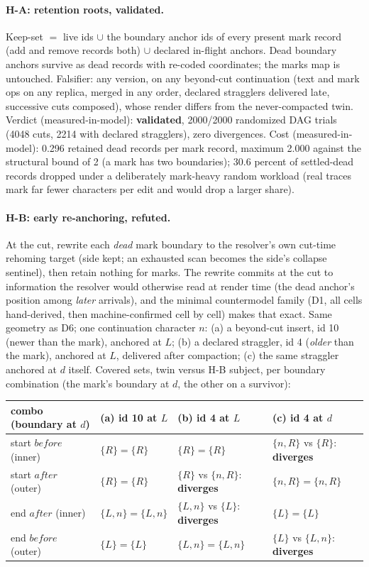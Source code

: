 \documentclass[11pt]{article}
\begin{document}
\paragraph{H-A: retention roots, validated.} Keep-set $=$ live ids
$\cup$ the boundary anchor ids of every present mark record (add and
remove records both) $\cup$ declared in-flight anchors. Dead boundary
anchors survive as dead records with re-coded coordinates; the marks
map is untouched. Falsifier: any version, on any beyond-cut
continuation (text and mark ops on any replica, merged in any order,
declared stragglers delivered late, successive cuts composed), whose
render differs from the never-compacted twin. Verdict
(measured-in-model): \textbf{validated}, 2000/2000 randomized DAG
trials (4048 cuts, 2214 with declared stragglers), zero divergences.
Cost (measured-in-model): 0.296 retained dead records per mark record,
maximum 2.000 against the structural bound of 2 (a mark has two
boundaries); 30.6 percent of settled-dead records dropped under a
deliberately mark-heavy random workload (real traces mark far fewer
characters per edit and would drop a larger share).

\paragraph{H-B: early re-anchoring, refuted.} At the cut, rewrite each
\emph{dead} mark boundary to the resolver's own cut-time rehoming
target (side kept; an exhausted scan becomes the side's collapse
sentinel), then retain nothing for marks. The rewrite commits at the
cut to information the resolver would otherwise read at render time
(the dead anchor's position among \emph{later} arrivals), and the
minimal countermodel family (D1, all cells hand-derived, then
machine-confirmed cell by cell) makes that exact. Same geometry as D6;
one continuation character $n$: (a) a beyond-cut insert, id 10 (newer
than the mark), anchored at $L$; (b) a declared straggler, id 4
(\emph{older} than the mark), anchored at $L$, delivered after
compaction; (c) the same straggler anchored at $d$ itself. Covered
sets, twin versus H-B subject, per boundary combination (the mark's
boundary at $d$, the other on a survivor):

\begin{center}\small
\begin{tabular}{@{}llll@{}}
\toprule
combo (boundary at $d$) & (a) id 10 at $L$ & (b) id 4 at $L$ &
  (c) id 4 at $d$ \\
\midrule
start $\mathit{before}$ (inner) & $\{R\} = \{R\}$ & $\{R\} = \{R\}$ &
  $\{n,R\}$ vs $\{R\}$: \textbf{diverges} \\
start $\mathit{after}$ (outer) & $\{R\} = \{R\}$ &
  $\{R\}$ vs $\{n,R\}$: \textbf{diverges} & $\{n,R\} = \{n,R\}$ \\
end $\mathit{after}$ (inner) & $\{L,n\} = \{L,n\}$ &
  $\{L,n\}$ vs $\{L\}$: \textbf{diverges} & $\{L\} = \{L\}$ \\
end $\mathit{before}$ (outer) & $\{L\} = \{L\}$ & $\{L,n\} = \{L,n\}$ &
  $\{L\}$ vs $\{L,n\}$: \textbf{diverges} \\
\bottomrule
\end{tabular}
\end{center}
\end{document}
